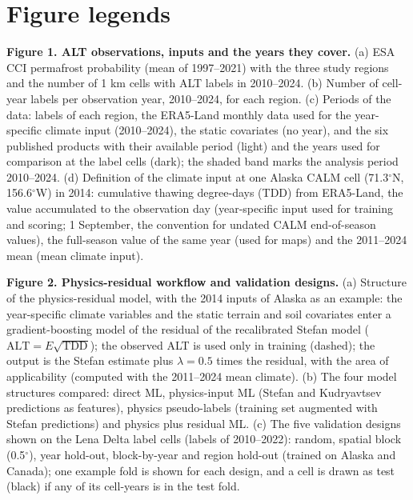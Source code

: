 \section*{Figure legends}

\textbf{Figure 1. ALT observations, inputs and the years they cover.} (a) ESA CCI permafrost probability (mean of 1997--2021) with the three study regions and the number of 1 km cells with ALT labels in 2010--2024. (b) Number of cell-year labels per observation year, 2010--2024, for each region. (c) Periods of the data: labels of each region, the ERA5-Land monthly data used for the year-specific climate input (2010--2024), the static covariates (no year), and the six published products with their available period (light) and the years used for comparison at the label cells (dark); the shaded band marks the analysis period 2010--2024. (d) Definition of the climate input at one Alaska CALM cell (71.3$^\circ$N, 156.6$^\circ$W) in 2014: cumulative thawing degree-days (TDD) from ERA5-Land, the value accumulated to the observation day (year-specific input used for training and scoring; 1 September, the convention for undated CALM end-of-season values), the full-season value of the same year (used for maps) and the 2011--2024 mean (mean climate input).

\textbf{Figure 2. Physics-residual workflow and validation designs.} (a) Structure of the physics-residual model, with the 2014 inputs of Alaska as an example: the year-specific climate variables and the static terrain and soil covariates enter a gradient-boosting model of the residual of the recalibrated Stefan model ($\mathrm{ALT}=E\sqrt{\mathrm{TDD}}$); the observed ALT is used only in training (dashed); the output is the Stefan estimate plus $\lambda=0.5$ times the residual, with the area of applicability (computed with the 2011--2024 mean climate). (b) The four model structures compared: direct ML, physics-input ML (Stefan and Kudryavtsev predictions as features), physics pseudo-labels (training set augmented with Stefan predictions) and physics plus residual ML. (c) The five validation designs shown on the Lena Delta label cells (labels of 2010--2022): random, spatial block (0.5$^\circ$), year hold-out, block-by-year and region hold-out (trained on Alaska and Canada); one example fold is shown for each design, and a cell is drawn as test (black) if any of its cell-years is in the test fold.

